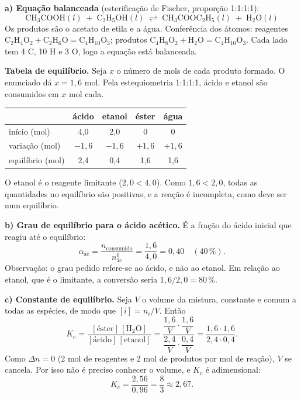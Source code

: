 \documentclass{article}%
\begin{document}
\textbf{a) Equação balanceada} (esterificação de Fischer, proporção 1:1:1:1):
\[
\mathrm{CH_3COOH}(l)\;+\;\mathrm{C_2H_5OH}(l)\;\rightleftharpoons\;\mathrm{CH_3COOC_2H_5}(l)\;+\;\mathrm{H_2O}(l)
\]
Os produtos são o acetato de etila e a água. Conferência dos átomos: reagentes $\mathrm{C_2H_4O_2}+\mathrm{C_2H_6O}=\mathrm{C_4H_{10}O_3}$; produtos $\mathrm{C_4H_8O_2}+\mathrm{H_2O}=\mathrm{C_4H_{10}O_3}$. Cada lado tem 4 C, 10 H e 3 O, logo a equação está balanceada.

\textbf{Tabela de equilíbrio.} Seja $x$ o número de mols de cada produto formado. O enunciado dá $x=1{,}6$ mol. Pela estequiometria 1:1:1:1, ácido e etanol são consumidos em $x$ mol cada.

\begin{center}
\begin{tabular}{l c c c c}
 & ácido & etanol & éster & água \\ \hline
início (mol) & 4,0 & 2,0 & 0 & 0 \\
variação (mol) & $-1{,}6$ & $-1{,}6$ & $+1{,}6$ & $+1{,}6$ \\
equilíbrio (mol) & 2,4 & 0,4 & 1,6 & 1,6 \\
\end{tabular}
\end{center}

O etanol é o reagente limitante ($2{,}0<4{,}0$). Como $1{,}6<2{,}0$, todas as quantidades no equilíbrio são positivas, e a reação é incompleta, como deve ser num equilíbrio.

\textbf{b) Grau de equilíbrio para o ácido acético.} É a fração do ácido inicial que reagiu até o equilíbrio:
\[
\alpha_{\text{ác}}=\frac{n_{\text{consumido}}}{n^{0}_{\text{ác}}}=\frac{1{,}6}{4{,}0}=0{,}40\quad(40\,\%).
\]
Observação: o grau pedido refere-se ao ácido, e não ao etanol. Em relação ao etanol, que é o limitante, a conversão seria $1{,}6/2{,}0=80\,\%$.

\textbf{c) Constante de equilíbrio.} Seja $V$ o volume da mistura, constante e comum a todas as espécies, de modo que $[i]=n_i/V$. Então
\[
K_c=\frac{[\text{éster}]\,[\text{H}_2\text{O}]}{[\text{ácido}]\,[\text{etanol}]}
=\frac{\dfrac{1{,}6}{V}\cdot\dfrac{1{,}6}{V}}{\dfrac{2{,}4}{V}\cdot\dfrac{0{,}4}{V}}
=\frac{1{,}6\cdot 1{,}6}{2{,}4\cdot 0{,}4}.
\]
Como $\Delta n=0$ (2 mol de reagentes e 2 mol de produtos por mol de reação), $V$ se cancela. Por isso não é preciso conhecer o volume, e $K_c$ é adimensional:
\[
K_c=\frac{2{,}56}{0{,}96}=\frac{8}{3}\approx 2{,}67 .
\]
\end{document}
